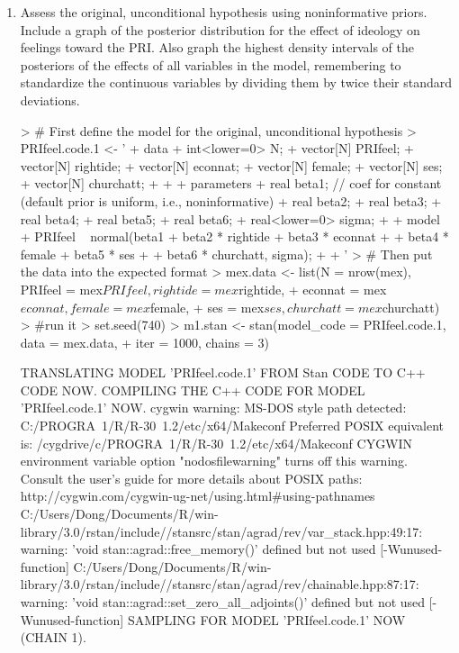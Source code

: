 \documentclass[12pt]{article}
\begin{document}
\begin{enumerate}
\item Assess the original, unconditional hypothesis using noninformative priors.  Include a graph of the posterior distribution for the effect of ideology on feelings toward the PRI.  Also graph the highest density intervals of the posteriors of the effects of all variables in the model, remembering to standardize the continuous variables by dividing them by twice their standard deviations. 

\begin{Schunk}
\begin{Sinput}
> # First define the model for the original, unconditional hypothesis
> PRIfeel.code.1 <- '
+     data {
+         int<lower=0> N;
+         vector[N] PRIfeel;
+         vector[N] rightide;
+         vector[N] econnat;
+         vector[N] female;
+         vector[N] ses;
+         vector[N] churchatt;
+     }
+    
+     parameters {                
+         real beta1;             // coef for constant (default prior is uniform, i.e., noninformative)
+         real beta2;             
+         real beta3;
+         real beta4;
+         real beta5;
+         real beta6;
+         real<lower=0> sigma;
+     }
+     model {
+         PRIfeel ~ normal(beta1 + beta2 * rightide + beta3 * econnat +
+                              beta4 * female + beta5 * ses +
+                              beta6 * churchatt, sigma);
+     }
+ '
> # Then put the data into the expected format
> mex.data <- list(N = nrow(mex), PRIfeel = mex$PRIfeel, rightide = mex$rightide,
+                    econnat = mex$econnat, female = mex$female, 
+                    ses = mex$ses, churchatt = mex$churchatt)
> #run it
> set.seed(740)
> m1.stan <- stan(model_code = PRIfeel.code.1, data = mex.data, 
+                 iter = 1000, chains = 3)
\end{Sinput}
\begin{Soutput}
TRANSLATING MODEL 'PRIfeel.code.1' FROM Stan CODE TO C++ CODE NOW.
COMPILING THE C++ CODE FOR MODEL 'PRIfeel.code.1' NOW.
cygwin warning:
  MS-DOS style path detected: C:/PROGRA~1/R/R-30~1.2/etc/x64/Makeconf
  Preferred POSIX equivalent is: /cygdrive/c/PROGRA~1/R/R-30~1.2/etc/x64/Makeconf
  CYGWIN environment variable option "nodosfilewarning" turns off this warning.
  Consult the user's guide for more details about POSIX paths:
    http://cygwin.com/cygwin-ug-net/using.html#using-pathnames
C:/Users/Dong/Documents/R/win-library/3.0/rstan/include//stansrc/stan/agrad/rev/var_stack.hpp:49:17: warning: 'void stan::agrad::free_memory()' defined but not used [-Wunused-function]
C:/Users/Dong/Documents/R/win-library/3.0/rstan/include//stansrc/stan/agrad/rev/chainable.hpp:87:17: warning: 'void stan::agrad::set_zero_all_adjoints()' defined but not used [-Wunused-function]
SAMPLING FOR MODEL 'PRIfeel.code.1' NOW (CHAIN 1).


\end{Soutput}
\end{Schunk}
\end{enumerate}
\end{document}
